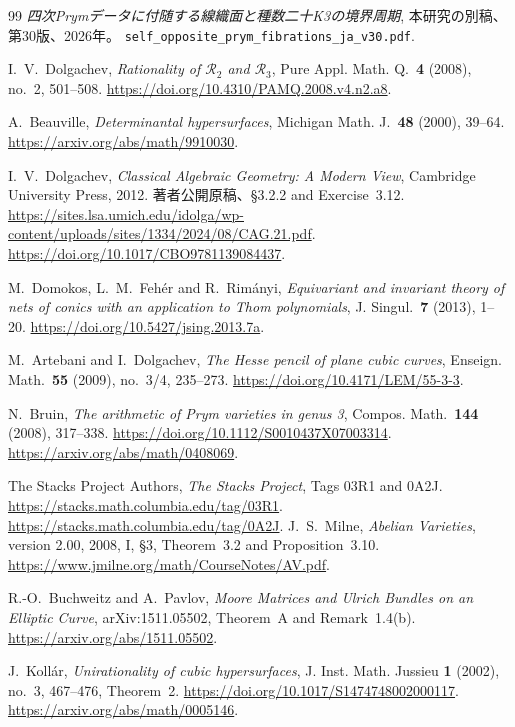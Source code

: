 \clearpage
\begin{thebibliography}{99}
\emph{四次Prymデータに付随する線織面と種数二十K3の境界周期},
本研究の別稿、第30版、2026年。
\nolinkurl{self_opposite_prym_fibrations_ja_v30.pdf}.

I.~V.~Dolgachev, \emph{Rationality of $\mathcal R_2$ and $\mathcal R_3$},
Pure Appl. Math. Q.\ \textbf{4} (2008), no.~2, 501--508.
\url{https://doi.org/10.4310/PAMQ.2008.v4.n2.a8}.

A.~Beauville, \emph{Determinantal hypersurfaces},
Michigan Math. J.\ \textbf{48} (2000), 39--64.
\url{https://arxiv.org/abs/math/9910030}.

I.~V.~Dolgachev, \emph{Classical Algebraic Geometry: A Modern View},
Cambridge University Press, 2012.
著者公開原稿、\S3.2.2 and Exercise~3.12.
\url{https://sites.lsa.umich.edu/idolga/wp-content/uploads/sites/1334/2024/08/CAG.21.pdf}.
\url{https://doi.org/10.1017/CBO9781139084437}.

M.~Domokos, L.~M.~Feh\'er and R.~Rim\'anyi,
\emph{Equivariant and invariant theory of nets of conics with an application to Thom polynomials},
J. Singul.\ \textbf{7} (2013), 1--20.
\url{https://doi.org/10.5427/jsing.2013.7a}.

M.~Artebani and I.~Dolgachev, \emph{The Hesse pencil of plane cubic curves},
Enseign. Math.\ \textbf{55} (2009), no.~3/4, 235--273.
\url{https://doi.org/10.4171/LEM/55-3-3}.

N.~Bruin, \emph{The arithmetic of Prym varieties in genus 3},
Compos. Math.\ \textbf{144} (2008), 317--338.
\url{https://doi.org/10.1112/S0010437X07003314}.
\url{https://arxiv.org/abs/math/0408069}.

The Stacks Project Authors, \emph{The Stacks Project}, Tags 03R1 and 0A2J.
\url{https://stacks.math.columbia.edu/tag/03R1}.
\url{https://stacks.math.columbia.edu/tag/0A2J}.
J.~S.~Milne, \emph{Abelian Varieties}, version 2.00, 2008,
I, \S3, Theorem~3.2 and Proposition~3.10.
\url{https://www.jmilne.org/math/CourseNotes/AV.pdf}.

R.-O.~Buchweitz and A.~Pavlov,
\emph{Moore Matrices and Ulrich Bundles on an Elliptic Curve},
arXiv:1511.05502, Theorem~A and Remark~1.4(b).
\url{https://arxiv.org/abs/1511.05502}.

J.~Koll\'ar, \emph{Unirationality of cubic hypersurfaces},
J. Inst. Math. Jussieu \textbf{1} (2002), no.~3, 467--476, Theorem~2.
\url{https://doi.org/10.1017/S1474748002000117}.
\url{https://arxiv.org/abs/math/0005146}.
\end{thebibliography}

